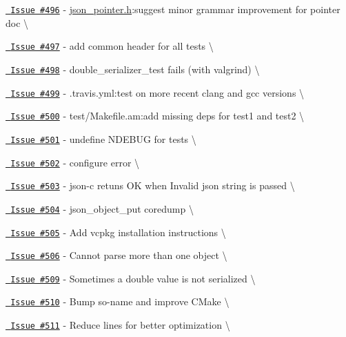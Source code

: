 \begin{DoxyItemize}
\item \href{https://github.com/json-c/json-c/issues/496}{\texttt{ Issue \#496}} -\/ \mbox{\hyperlink{json__pointer_8h}{json\+\_\+pointer.\+h}}\+:suggest minor grammar improvement for pointer doc \textbackslash{}
\item \href{https://github.com/json-c/json-c/issues/497}{\texttt{ Issue \#497}} -\/ add common header for all tests \textbackslash{}
\item \href{https://github.com/json-c/json-c/issues/498}{\texttt{ Issue \#498}} -\/ double\+\_\+serializer\+\_\+test fails (with valgrind) \textbackslash{}
\item \href{https://github.com/json-c/json-c/issues/499}{\texttt{ Issue \#499}} -\/ .travis.\+yml\+:test on more recent clang and gcc versions \textbackslash{}
\item \href{https://github.com/json-c/json-c/issues/500}{\texttt{ Issue \#500}} -\/ test/\+Makefile.\+am\+:add missing deps for test1 and test2 \textbackslash{}
\item \href{https://github.com/json-c/json-c/issues/501}{\texttt{ Issue \#501}} -\/ undefine NDEBUG for tests \textbackslash{}
\item \href{https://github.com/json-c/json-c/issues/502}{\texttt{ Issue \#502}} -\/ configure error \textbackslash{}
\item \href{https://github.com/json-c/json-c/issues/503}{\texttt{ Issue \#503}} -\/ json-\/c retuns OK when Invalid json string is passed \textbackslash{}
\item \href{https://github.com/json-c/json-c/issues/504}{\texttt{ Issue \#504}} -\/ json\+\_\+object\+\_\+put coredump \textbackslash{}
\item \href{https://github.com/json-c/json-c/issues/505}{\texttt{ Issue \#505}} -\/ Add vcpkg installation instructions \textbackslash{}
\item \href{https://github.com/json-c/json-c/issues/506}{\texttt{ Issue \#506}} -\/ Cannot parse more than one object \textbackslash{}
\item \href{https://github.com/json-c/json-c/issues/509}{\texttt{ Issue \#509}} -\/ Sometimes a double value is not serialized \textbackslash{}
\item \href{https://github.com/json-c/json-c/issues/510}{\texttt{ Issue \#510}} -\/ Bump so-\/name and improve CMake \textbackslash{}
\item \href{https://github.com/json-c/json-c/issues/511}{\texttt{ Issue \#511}} -\/ Reduce lines for better optimization \textbackslash{}

\end{DoxyItemize}
